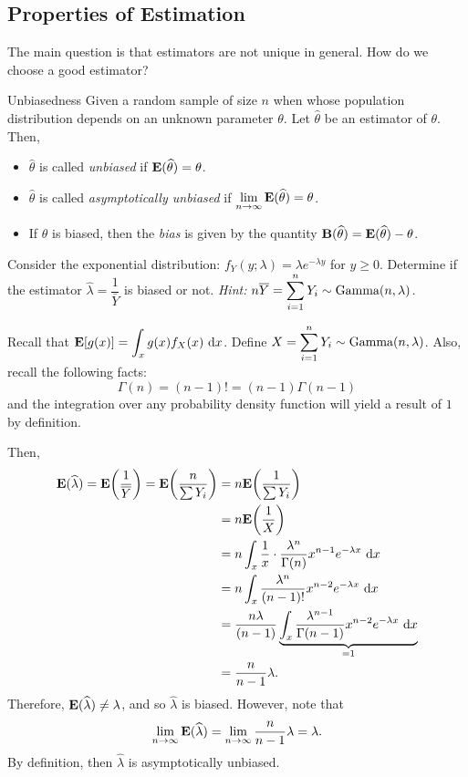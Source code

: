 \subsection{Properties of Estimation}
The main question is that estimators are not unique in general. How do we choose a good estimator? 
\begin{df}{Unbiasedness}
	Given a random sample of size $n$ when whose population distribution depends on an unknown parameter $\theta$. Let $\hat\theta$ be an estimator of $\theta$. Then, 
	\begin{itemize}
		\item $\hat\theta$ is called \textit{unbiased} if $\vb{E}(\widehat\theta)=\theta$.
		\item $\hat\theta$ is called \textit{asymptotically unbiased} if $\displaystyle\lim_{n\to\infty}\vb{E}(\widehat\theta)=\theta$.
		\item If $\theta$ is biased, then the \textit{bias} is given by the quantity $\vb{B}(\widehat\theta)=\vb{E}(\widehat\theta)-\theta$.
	\end{itemize}
\end{df}
\begin{eg}
	Consider the exponential distribution: $f_Y(y;\lambda)=\lambda e^{-\lambda y}$ for $y\geq0$. Determine if the estimator $\hat\lambda=\dfrac{1}{\bar Y}$ is biased or not. \newline\textit{Hint: $n\overline Y=\displaystyle\sum_{i=1}^nY_i\sim\text{Gamma}(n,\lambda)$.}
	\begin{sol}
		Recall that $\vb{E}[g(x)]\displaystyle=\int_xg(x)f_X(x)\ \mathrm{d}{x}$. Define $X=\displaystyle\sum_{i=1}^nY_i\sim\text{Gamma}(n,\lambda)$. Also, recall the following facts: \[\Gamma(n)=(n-1)!=(n-1)\Gamma(n-1)\] and the integration over any probability density function will yield a result of $1$ by definition. \par  Then, \begin{align*}\E(\hat\lambda)=\E\qty(\dfrac{1}{\bar Y})=\E\qty(\dfrac{n}{\sum Y_i})&=n\E\qty(\dfrac{1}{\sum Y_i})\\&=n\E\qty(\dfrac{1}{X})\\&=n\int_x\dfrac{1}{x}\cdot\dfrac{\lambda^n}{\Gamma(n)}x^{n-1}e^{-\lambda x}\ \d{x}\\&=n\int_x\dfrac{\lambda^n}{(n-1)!}x^{n-2}e^{-\lambda x}\ \d{x}\\&=\dfrac{n\lambda}{(n-1)}\underbrace{\int_x\dfrac{\lambda^{n-1}}{\Gamma(n-1)}x^{n-2}e^{-\lambda x}\ \d{x}}_{=1}\\&=\dfrac{n}{n-1}\lambda.\end{align*} Therefore, $\vb{E}(\widehat\lambda)\neq\lambda$, and so $\hat\lambda$ is biased. However, note that \[\lim_{n\to\infty}\vb{E}(\widehat\lambda)=\lim_{n\to\infty}\dfrac{n}{n-1}\lambda=\lambda.\] By definition, then $\hat\lambda$ is asymptotically unbiased. 
	\end{sol}
\end{eg}
